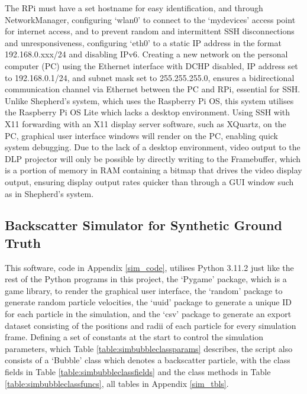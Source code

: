 The RPi must have a set hostname for easy identification, and through NetworkManager, configuring `wlan0' to connect to the `mydevices' access point for internet access, and to prevent random and intermittent SSH disconnections and unresponsiveness, configuring `eth0' to a static IP address in the format 192.168.0.xxx/24 and disabling IPv6. Creating a new network on the personal computer (PC) using the Ethernet interface with DCHP disabled, IP address set to 192.168.0.1/24, and subnet mask set to 255.255.255.0, ensures a bidirectional communication channel via Ethernet between the PC and RPi, essential for SSH. Unlike Shepherd's system, which uses the Raspberry Pi OS, this system utilises the Raspberry Pi OS Lite which lacks a desktop environment. Using SSH with X11 forwarding with an X11 display server software, such as XQuartz, on the PC, graphical user interface windows will render on the PC, enabling quick system debugging. Due to the lack of a desktop environment, video output to the DLP projector will only be possible by directly writing to the Framebuffer, which is a portion of memory in RAM containing a bitmap that drives the video display output, ensuring display output rates quicker than through a GUI window such as in Shepherd's system.

\subsection{Backscatter Simulator for Synthetic Ground Truth}

This software, code in Appendix \ref{sim_code}, utilises Python 3.11.2 just like the rest of the Python programs in this project, the `Pygame' package, which is a game library, to render the graphical user interface, the `random' package to generate random particle velocities, the `uuid' package to generate a unique ID for each particle in the simulation, and the `csv' package to generate an export dataset consisting of the positions and radii of each particle for every simulation frame. Defining a set of constants at the start to control the simulation parameters, which Table \ref{table:simbubbleclassparams} describes, the script also consists of a `Bubble' class which denotes a backscatter particle, with the class fields in Table \ref{table:simbubbleclassfields} and the class methods in Table \ref{table:simbubbleclassfuncs}, all tables in Appendix \ref{sim_tbls}.

